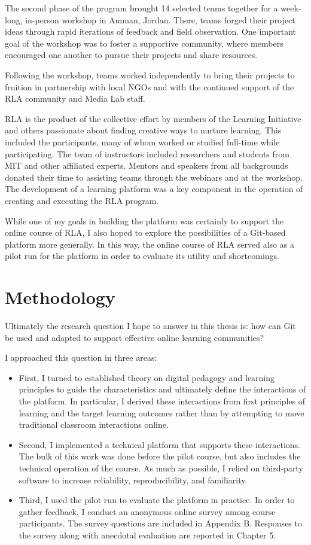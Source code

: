 \documentclass[12pt,twoside]{mitthesis}
\begin{document}
The second phase of the program brought 14 selected teams together for a week-long, in-person workshop in Amman, Jordan. There, teams forged their project ideas through rapid iterations of feedback and field observation. One important goal of the workshop was to foster a supportive community, where members encouraged one another to pursue their projects and share resources.

Following the workshop, teams worked independently to bring their projects to fruition in partnership with local NGOs and with the continued support of the RLA community and Media Lab staff.~\cite{rla}

RLA is the product of the collective effort by members of the Learning Initiative and others passionate about finding creative ways to nurture learning. This included the participants, many of whom worked or studied full-time while participating. The team of instructors included researchers and students from MIT and other affiliated experts. Mentors and speakers from all backgrounds donated their time to assisting teams through the webinars and at the workshop. The development of a learning platform was a key component in the operation of creating and executing the RLA program. 

While one of my goals in building the platform was certainly to support the online course of RLA, I also hoped to explore the possibilities of a Git-based platform more generally. In this way, the online course of RLA served also as a pilot run for the platform in order to evaluate its utility and shortcomings. 

\section{Methodology}

Ultimately the research question I hope to answer in this thesis is: how can Git be used and adapted to support effective online learning communities?

I approached this question in three areas:
\begin{itemize}
\item First, I turned to established theory on digital pedagogy and learning principles to guide the characteristics and ultimately define the interactions of the platform. In particular, I derived these interactions from first principles of learning and the target learning outcomes rather than by attempting to move traditional classroom interactions online.
\item Second, I implemented a technical platform that supports these interactions. The bulk of this work was done before the pilot course, but also includes the technical operation of the course. As much as possible, I relied on third-party software to increase reliability, reproducibility, and familiarity.
\item Third, I used the pilot run to evaluate the platform in practice. In order to gather feedback, I conduct an anonymous online survey among course participants. The survey questions are included in Appendix B. Responses to the survey along with anecdotal evaluation are reported in Chapter 5.
\end{itemize}
\end{document}
